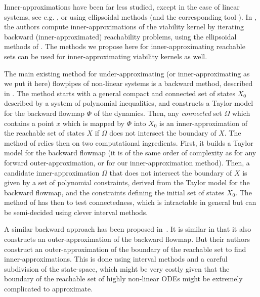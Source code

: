 \documentclass{sig-alternate-05-2015}
\begin{document}
Inner-approximations have been far less studied, except in the case of linear systems, 
see e.g. \cite{GirardLinear06}, or using ellipsoidal methods
\cite{kurzhanski2000ellipsoidal} (and the corresponding tool \cite{ellipsoidaltoolbox}).
In \cite{kaynama2012computing}, the authors compute inner-approximations
of the viability kernel by iterating backward (inner-approxima\-ted) reachability 
problems, using the ellipsoidal methods of \cite{kurzhanski2000ellipsoidal}. The methods 
we propose here for inner-approximating reachable sets 
can be used for inner-approxi\-mating viability kernels as well. 

The main existing method for under-approximating (or inner-approximating as we put it 
here) flowpipes of non-linear systems is a backward method, described in \cite{Underapproxflowpipes}. 
The method starts with a general
compact and connected 
set of states $X_0$ described by a system of polynomial inequalities, and constructs a Taylor
model for the backward flowmap $\Phi$ of the dynamics. Then, any {\em connected} set $\Omega$
which contains a point 
$x$ which is mapped by $\Phi$ into $X_0$ is an inner-approximation of the reachable set
of states $X$ if $\Omega$ does not intersect the boundary of 
$X$. The method of \cite{Underapproxflowpipes}
relies then on two computational ingredients. 
First, it builds a Taylor model for the backward flowmap (it is of the same order of complexity
as for any forward outer-approximation, or for our inner-approximation method). 
Then, a candidate inner-approximation $\Omega$ that does not intersect the boundary of $X$
is given by a set of polynomial constraints, derived
from the Taylor model for the backward flowmap, and the constraints defining the initial set
of states $X_0$. The method of \cite{Underapproxflowpipes} has then to test connectedness, which is intractable in general but
can be semi-decided using clever interval methods.

A similar backward approach %
has been proposed in~\cite{underapprox16}. It is similar in that it also constructs 
an outer-approximation of the backward flowmap. But their authors construct an outer-approximation
of the boundary of the reachable set to find inner-approximations. This is done using 
interval methods and a careful subdivision of the state-space, which might be very costly
given that the boundary of the reachable set of highly non-linear ODEs might be extremely 
complicated to approximate. 
\end{document}
